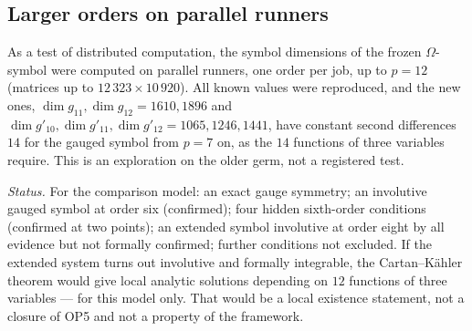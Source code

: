 \subsection{Larger orders on parallel runners}

As a test of distributed computation, the symbol dimensions of the frozen \(\Omega\)-symbol were computed on parallel runners, one order
per job, up to \(p=12\) (matrices up to \(12\,323\times10\,920\)).  All known values were reproduced, and the new ones,
\(\dim g_{11},\dim g_{12}=1610,1896\) and \(\dim g'_{10},\dim g'_{11},\dim g'_{12}=1065,1246,1441\), have constant second differences
\(14\) for the gauged symbol from \(p=7\) on, as the \(14\) functions of three variables require.  This is an exploration on the older
germ, not a registered test.

\medskip\noindent\emph{Status.}  For the comparison model: an exact gauge symmetry; an involutive gauged symbol at order six (confirmed);
four hidden sixth-order conditions (confirmed at two points); an extended symbol involutive at order eight by all evidence but not
formally confirmed; further conditions not excluded.  If the extended system turns out involutive and formally integrable, the
Cartan--K\"ahler theorem would give local analytic solutions depending on \(12\) functions of three variables --- for this model only.
That would be a local existence statement, not a closure of OP5 and not a property of the framework.
